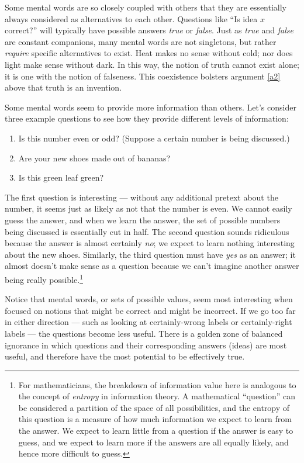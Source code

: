 \documentclass[11pt, oneside]{article}   	%
\begin{document}
Some mental words are so closely coupled with others that they are essentially
always considered as alternatives to each other. Questions like ``Is idea $x$
correct?'' will typically have possible answers {\em true} or {\em false}.
Just as {\em true} and {\em false} are constant companions,
many mental words are not singletons, but rather {\em require}
specific alternatives to exist. Heat makes no sense without cold; nor does light
make sense without dark. In this way, the notion of truth cannot exist alone;
it is one with the notion of falseness. This coexistence bolsters argument
\ref{a2} above that truth is an invention.

Some mental words seem to provide more information than others.
Let's consider three example questions to see how they provide
different levels of information:
\begin{enumerate}
    \item Is this number even or odd? (Suppose a certain number is being
        discussed.)
    \item Are your new shoes made out of bananas?
    \item Is this green leaf green?
\end{enumerate}
The first question is interesting --- without any additional pretext about the
number, it seems just as likely as not that the number is even. We cannot
easily guess the answer, and when we learn the answer, the set of possible
numbers being discussed is essentially cut in half.
The second question sounds ridiculous because the answer is almost certainly
{\em no}; we expect to learn nothing interesting about the new shoes.
Similarly,
the third question must have {\em yes} as an answer; it almost doesn't make
sense as a question because we can't imagine another answer being really
possible.\footnote{For
mathematicians, the breakdown of information value here is
analogous to the concept of {\em entropy} in information theory.
A mathematical ``question'' can be considered a partition of the space of all
possibilities, and the entropy of this question is a measure of how much
information we expect to learn from the answer. We expect to learn little from a
question if the answer is easy to guess, and we expect to learn more if the
answers are all equally likely, and hence more difficult to guess.
}

Notice that mental words, or sets of possible values, seem most interesting when
focused on notions that might be correct and might be incorrect. If we go too
far in either direction --- such as looking at certainly-wrong labels or
certainly-right labels --- the questions become less useful.
There is a golden zone of balanced ignorance in which questions and their
corresponding answers (ideas) are most useful, and therefore have the most
potential to be effectively true.
\end{document}
